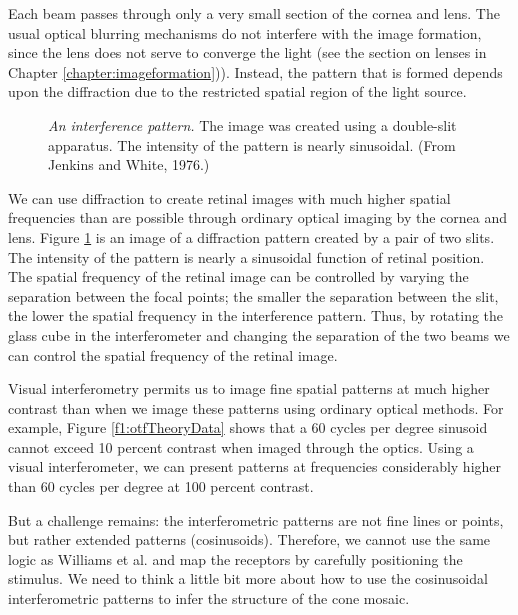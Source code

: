 Each beam passes through 
only a very small section of the cornea and lens.
The usual optical blurring mechanisms do not
interfere with the image formation,
since the lens does not serve to converge the light
(see the section on lenses in Chapter \ref{chapter:imageformation})).
Instead, the pattern that is formed depends upon the
diffraction due to the restricted spatial region of the
light source.

\begin{figure}
\centerline{
}
\caption[Sinusoidal Interference Pattern]{
{\em An interference pattern.}  The image
was created using a double-slit apparatus.
The intensity of the pattern is nearly sinusoidal.
(From Jenkins and White, 1976.)
}
\label{f2:interference.sinusoid}
\end{figure}
We can use diffraction to create retinal images with
much higher spatial frequencies than are possible
through ordinary optical imaging by the cornea and lens.
Figure \ref{f2:interference.sinusoid}
is an image of a diffraction pattern
created by a pair of two slits.
The intensity of the pattern
is nearly a sinusoidal function of retinal position.
The spatial frequency of the retinal image can be
controlled by varying the separation between the focal points;
the smaller the separation between the slit,
the lower the spatial frequency in the interference pattern.
Thus, by rotating the glass cube in the interferometer and
changing the separation of the two beams we can control
the spatial frequency of the retinal image.

Visual interferometry
permits us to image fine spatial patterns at
much higher contrast than
when we image these patterns using ordinary
optical methods.
For example, Figure \ref{f1:otfTheoryData} shows that
a $60$ cycles per degree sinusoid cannot
exceed 10 percent contrast when imaged through the optics.
Using a visual interferometer, we can present
patterns at frequencies considerably higher
than $60$ cycles per degree at 100 percent contrast.

But a challenge remains:
the interferometric patterns are not fine lines or points,
but rather extended patterns (cosinusoids).
Therefore, we cannot use the
same logic as Williams et al.
and map the receptors by carefully positioning
the stimulus.
We need to think a little bit more
about how to use the cosinusoidal interferometric patterns
to infer the structure of the cone mosaic.

